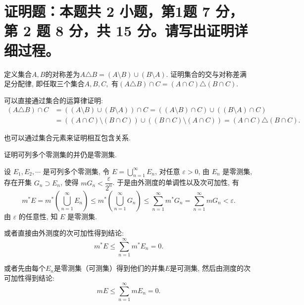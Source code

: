 \fi


\section{%
  证明题：本题共 2 小题，第1题 7 分，第 2 题 8 分，共 15 分。请写出证明详细过程。
}


\begin{question}[points = 7]
  定义集合$A, B$的对称差为$A \triangle B = (A \setminus B) \cup (B \setminus A).$ 证明集合的交与对称差满足分配律, 即任取三个集合$A, B, C,$ 有$(A \triangle B) \cap C = (A \cap C) \triangle (B \cap C).$
\end{question}

\begin{solution}
  可以直接通过集合的运算律证明:
  \[\begin{aligned}
  (A \triangle B) \cap C & = ((A \setminus B) \cup (B \setminus A)) \cap C = ((A \setminus B) \cap C) \cup ((B \setminus A) \cap C) \\
  & = ((A \cap C) \setminus (B \cap C)) \cup ((B \cap C) \setminus (A \cap C)) = (A \cap C) \triangle (B \cap C).
  \end{aligned}\]

  也可以通过集合元素来证明相互包含关系.
\end{solution}

\begin{question}[points = 8]
  证明可列多个零测集的并仍是零测集.
\end{question}

\begin{solution}
  设 \(E_1, E_2, \cdots\) 是可列多个零测集, 令 \(E = \bigcup\limits_{n=1}^{\infty} E_n\), 对任意 \(\varepsilon > 0\), 由 \(E_n\) 是零测集, 存在开集 \(G_n \supset E_n\), 使得 \(m G_n < \dfrac{\varepsilon}{2^n}\). 于是由外测度的单调性以及次可加性, 有
  \[m^* E = m^* \left( \bigcup\limits_{n=1}^{\infty} E_n \right) \leqslant m^* \left( \bigcup\limits_{n=1}^{\infty} G_n \right) \leqslant \sum\limits_{n=1}^{\infty} m^* G_n = \sum\limits_{n=1}^{\infty} m G_n < \varepsilon.\]
  由 \(\varepsilon\) 的任意性, 知 \(E\) 是零测集.

  或者直接由外测度的次可加性得到结论:
  \[m^* E \leqslant \sum\limits_{n=1}^{\infty} m^* E_n = 0.\]

  或者先由每个\(E_n\)是零测集（可测集）得到他们的并集\(E\)是可测集, 然后由测度的次可加性得到结论:
  \[m E \leqslant \sum\limits_{n=1}^{\infty} m E_n = 0.\]
\end{solution}


